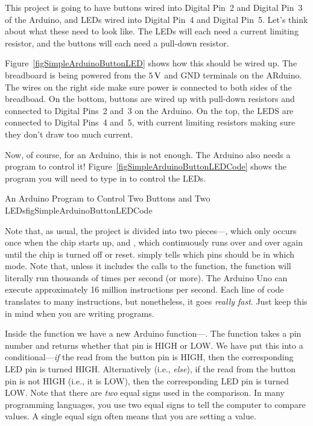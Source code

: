 This project is going to have buttons wired into Digital Pin~2 and Digital Pin~3 of the Arduino, and LEDs wired into Digital Pin~4 and Digital Pin~5.
Let's think about what these need to look like.
The LEDs will each need a current limiting resistor, and the buttons will each need a pull-down resistor.


Figure~\ref{figSimpleArduinoButtonLED} shows how this should be wired up.
The breadboard is being powered from the $5\,\si{\volt}$ and GND terminals on the ARduino.
The wires on the right side make sure power is connected to both sides of the breadboad.
On the bottom, buttons are wired up with pull-down resistors and connected to Digital Pins~2 and~3 on the Arduino.
On the top, the LEDS are connected to Digital Pins~4 and~5, with current limiting resistors making sure they don't draw too much current.

Now, of course, for an Arduino, this is not enough.
The Arduino also needs a program to control it!
Figure~\ref{figSimpleArduinoButtonLEDCode} shows the program you will need to type in to control the LEDs.

\begin{typingwithlabel}{An Arduino Program to Control Two Buttons and Two LEDs}{figSimpleArduinoButtonLEDCode}

\end{typingwithlabel}

Note that, as usual, the project is divided into two pieces---, which only occurs once when the chip starts up, and , which continuously runs over and over again until the chip is turned off or reset.
 simply tells which pins should be in which mode.
Note that, unless it includes the calls to the  function, the  function will literally run thousands of times per second (or more).
The Arduino Uno can execute approximately 16 million instructions per second.
Each line of code translates to many instructions, but nonetheless, it goes \emph{really fast}.  
Just keep this in mind when you are writing programs.

Inside the  function we have a new Arduino function---.
The  function takes a pin number and returns whether that pin is HIGH or LOW.
We have put this into a conditional---\emph{if} the read from the button pin is HIGH, then the corresponding LED pin is turned HIGH.  
Alternatively (i.e., \emph{else}), if the read from the button pin is not HIGH (i.e., it is LOW), then the corresponding LED pin is turned LOW.
Note that there are \emph{two} equal signs used in the comparison.
In many programming languages, you use two equal signs to tell the computer to compare values.
A single equal sign often means that you are setting a value.

